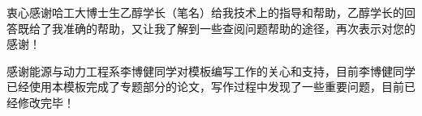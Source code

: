 \begin{thanking}
	衷心感谢哈工大博士生乙醇学长（笔名）给我技术上的指导和帮助，乙醇学长的回答既给了我准确的帮助，又让我了解到一些查阅问题帮助的途径，再次表示对您的感谢！
	
	感谢能源与动力工程系李博健同学对模板编写工作的关心和支持，目前李博健同学已经使用本模板完成了专题部分的论文，写作过程中发现了一些重要问题，目前已经修改完毕！
\end{thanking}